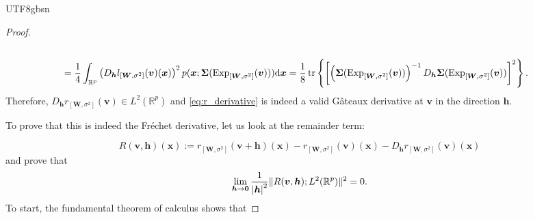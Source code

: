 \documentclass[12pt]{report}
\newcommand{\bracket}[1]{\left ( #1 \right )}
\newcommand{\curly}[1]{\left \{ #1 \right \} }
\newcommand{\squared}[1]{\left [ #1 \right ]}
\theoremstyle{plain}
\theoremstyle{definition}
\begin{document}
\begin{CJK*}{UTF8}{gbsn}
\begin{proof}
\begin{equation}
\begin{split}
   \\ & = \frac{1}{4}\int_{\mathbb{R}^p} \bracket{D_{\bm{h}}l_{[\bm{W},\sigma^2]}(\bm{v})(\bm{x})}^2
  p(\bm{x}; \bm{\Sigma}(\text{Exp}_{[\bm{W},\sigma^2]}(\bm{v})))\mathrm{d} \bm{x}
  = \frac{1}{8} \tr \curly{\squared{\bracket{\bm{\Sigma}(\text{Exp}_{[\bm{W},\sigma^2]}(\bm{v}))}^{-1}
  D_{\bm{h}}\bm{\Sigma}(\text{Exp}_{[\bm{W},\sigma^2]}(\bm{v}))}^2}.
  \end{split}
\end{equation} 
Therefore, $D_{\bm{h}}r_{[\bm{W},\sigma^2]}(\bm{v}) \in L^2(\mathbb{R}^p)$
and \eqref{eq:r_derivative} is indeed a 
valid Gâteaux derivative at $\bm{v}$ in the direction $\bm{h}$.

To prove that this is indeed the Fréchet derivative,
let us look at the remainder term:

\begin{equation*}
  R(\bm{v}, \bm{h})(\bm{x}) := 
  r_{[\bm{W},\sigma^2]}(\bm{v}+\bm{h})(\bm{x}) - 
  r_{[\bm{W},\sigma^2]}(\bm{v})(\bm{x}) - D_{\bm{h}}r_{[\bm{W},\sigma^2]}(\bm{v})(\bm{x}) 
\end{equation*}
and prove that 
\begin{equation*}
  \lim_{\bm{h} \to \bm{0}} \frac{1}{\abs{\bm{h}}^2}
  \|R(\bm{v}, \bm{h});L^2(\mathbb{R}^p)	\|^2 = 0.
\end{equation*}
To start, the fundamental theorem of calculus shows that


\end{proof}
\end{CJK*}
\end{document}
